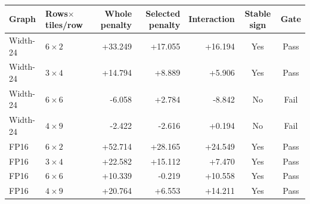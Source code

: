 \begin{tabular}{@{}llrrrcc@{}}
\toprule
Graph & Rows$\times$tiles/row & Whole penalty & Selected penalty & Interaction & Stable sign & Gate \\
\midrule
Width-24 & $6\times2$ & +33.249 & +17.055 & +16.194 & Yes & Pass \\
Width-24 & $3\times4$ & +14.794 & +8.889 & +5.906 & Yes & Pass \\
Width-24 & $6\times6$ & -6.058 & +2.784 & -8.842 & No & Fail \\
Width-24 & $4\times9$ & -2.422 & -2.616 & +0.194 & No & Fail \\
FP16 & $6\times2$ & +52.714 & +28.165 & +24.549 & Yes & Pass \\
FP16 & $3\times4$ & +22.582 & +15.112 & +7.470 & Yes & Pass \\
FP16 & $6\times6$ & +10.339 & -0.219 & +10.558 & Yes & Pass \\
FP16 & $4\times9$ & +20.764 & +6.553 & +14.211 & Yes & Pass \\
\bottomrule
\end{tabular}
